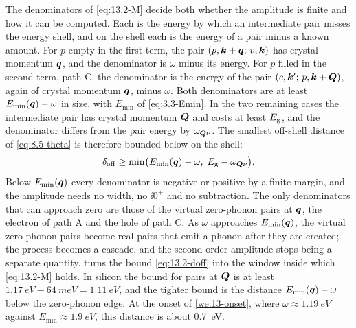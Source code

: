 The denominators of \cref{eq:13.2-M} decide both whether the amplitude is finite and how it can be computed. Each is the energy by which an intermediate pair misses the energy shell, and on the shell each is the energy of a pair minus a known amount. For $p$ empty in the first term, the pair $(p,\bm{k}+\bm{q};\,v,\bm{k})$ has crystal momentum $\bm{q}$, and the denominator is $\omega$ minus its energy. For $p$ filled in the second term, path C, the denominator is the energy of the pair $(c,\bm{k}';\,p,\bm{k}+\bm{Q})$, again of crystal momentum $\bm{q}$, minus $\omega$. Both denominators are at least $E_{\mathrm{min}}(\bm{q}) - \omega$ in size, with $E_{\mathrm{min}}$ of \cref{eq:3.3-Emin}. In the two remaining cases the intermediate pair has crystal momentum $\bm{Q}$ and costs at least $E_{\mathrm{g}}$, and the denominator differs from the pair energy by $\omega_{\bm{Q}\nu}$. The smallest off-shell distance of \cref{eq:8.5-theta} is therefore bounded below on the shell:
\begin{equation}
  \delta_{\mathrm{off}} \ge \min\bigl(E_{\mathrm{min}}(\bm{q}) - \omega,\;E_{\mathrm{g}} - \omega_{\bm{Q}\nu}\bigr) .
  \label{eq:13.2-doff}
\end{equation}
Below $E_{\mathrm{min}}(\bm{q})$ every denominator is negative or positive by a finite margin, and the amplitude needs no width, no $\ii0^+$ and no subtraction. The only denominators that can approach zero are those of the virtual zero-phonon pairs at $\bm{q}$, the electron of path A and the hole of path C. As $\omega$ approaches $E_{\mathrm{min}}(\bm{q})$, the virtual zero-phonon pairs become real pairs that emit a phonon after they are created; the process becomes a cascade, and the second-order amplitude stops being a separate quantity.  turns the bound \cref{eq:13.2-doff} into the window inside which \cref{eq:13.2-M} holds. In silicon the bound for pairs at $\bm{Q}$ is at least $\SI{1.17}{eV} - \SI{64}{meV} = \SI{1.11}{eV}$, and the tighter bound is the distance $E_{\mathrm{min}}(\bm{q}) - \omega$ below the zero-phonon edge. At the onset of \cref{we:13-onset}, where $\omega \approx \SI{1.19}{eV}$ against $E_{\mathrm{min}} \approx \SI{1.9}{eV}$, this distance is about \SI{0.7}{eV}.

